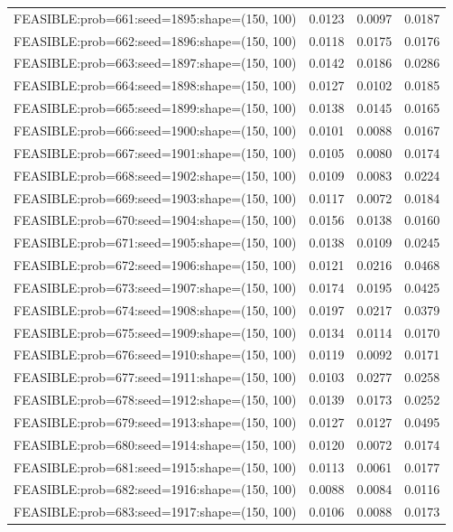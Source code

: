 \begin{longtable}{lccc}
FEASIBLE:prob=661:seed=1895:shape=(150, 100) &   0.0123 & 0.0097 & 0.0187 \\
FEASIBLE:prob=662:seed=1896:shape=(150, 100) &   0.0118 & 0.0175 & 0.0176 \\
FEASIBLE:prob=663:seed=1897:shape=(150, 100) &   0.0142 & 0.0186 & 0.0286 \\
FEASIBLE:prob=664:seed=1898:shape=(150, 100) &   0.0127 & 0.0102 & 0.0185 \\
FEASIBLE:prob=665:seed=1899:shape=(150, 100) &   0.0138 & 0.0145 & 0.0165 \\
FEASIBLE:prob=666:seed=1900:shape=(150, 100) &   0.0101 & 0.0088 & 0.0167 \\
FEASIBLE:prob=667:seed=1901:shape=(150, 100) &   0.0105 & 0.0080 & 0.0174 \\
FEASIBLE:prob=668:seed=1902:shape=(150, 100) &   0.0109 & 0.0083 & 0.0224 \\
FEASIBLE:prob=669:seed=1903:shape=(150, 100) &   0.0117 & 0.0072 & 0.0184 \\
FEASIBLE:prob=670:seed=1904:shape=(150, 100) &   0.0156 & 0.0138 & 0.0160 \\
FEASIBLE:prob=671:seed=1905:shape=(150, 100) &   0.0138 & 0.0109 & 0.0245 \\
FEASIBLE:prob=672:seed=1906:shape=(150, 100) &   0.0121 & 0.0216 & 0.0468 \\
FEASIBLE:prob=673:seed=1907:shape=(150, 100) &   0.0174 & 0.0195 & 0.0425 \\
FEASIBLE:prob=674:seed=1908:shape=(150, 100) &   0.0197 & 0.0217 & 0.0379 \\
FEASIBLE:prob=675:seed=1909:shape=(150, 100) &   0.0134 & 0.0114 & 0.0170 \\
FEASIBLE:prob=676:seed=1910:shape=(150, 100) &   0.0119 & 0.0092 & 0.0171 \\
FEASIBLE:prob=677:seed=1911:shape=(150, 100) &   0.0103 & 0.0277 & 0.0258 \\
FEASIBLE:prob=678:seed=1912:shape=(150, 100) &   0.0139 & 0.0173 & 0.0252 \\
FEASIBLE:prob=679:seed=1913:shape=(150, 100) &   0.0127 & 0.0127 & 0.0495 \\
FEASIBLE:prob=680:seed=1914:shape=(150, 100) &   0.0120 & 0.0072 & 0.0174 \\
FEASIBLE:prob=681:seed=1915:shape=(150, 100) &   0.0113 & 0.0061 & 0.0177 \\
FEASIBLE:prob=682:seed=1916:shape=(150, 100) &   0.0088 & 0.0084 & 0.0116 \\
FEASIBLE:prob=683:seed=1917:shape=(150, 100) &   0.0106 & 0.0088 & 0.0173 \\

\end{longtable}
